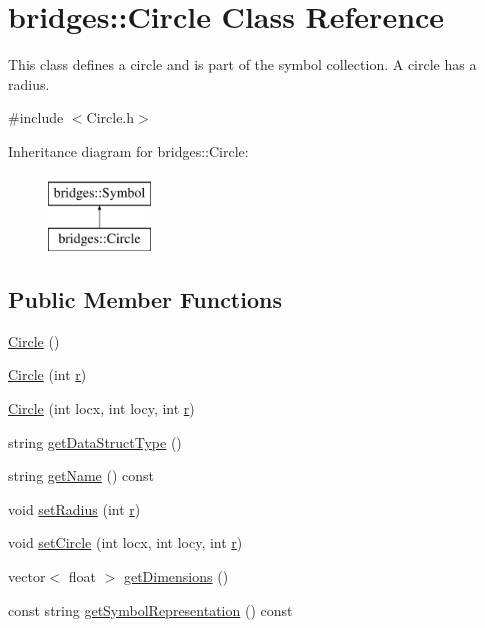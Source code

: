 \hypertarget{classbridges_1_1_circle}{}\section{bridges\+::Circle Class Reference}
\label{classbridges_1_1_circle}


This class defines a circle and is part of the symbol collection. A circle has a radius.  




{\ttfamily \#include $<$Circle.\+h$>$}

Inheritance diagram for bridges\+::Circle\+:\begin{figure}[H]
\begin{center}
\leavevmode
\includegraphics[height=2.000000cm]{classbridges_1_1_circle}
\end{center}
\end{figure}
\subsection*{Public Member Functions}
\begin{DoxyCompactItemize}
\item 
\mbox{\hyperlink{classbridges_1_1_circle_a97471b91ab283daf66e257ba982bf404}{Circle}} ()
\item 
\mbox{\hyperlink{classbridges_1_1_circle_a970e38244503f91ca4003acb183763fb}{Circle}} (int \mbox{\hyperlink{namespacebridges_acfb0a4f7877d8f63de3e6862004c50eda4b43b0aee35624cd95b910189b3dc231}{r}})
\item 
\mbox{\hyperlink{classbridges_1_1_circle_a09b339c2b9f3ee8dfa95d05cb695bb59}{Circle}} (int locx, int locy, int \mbox{\hyperlink{namespacebridges_acfb0a4f7877d8f63de3e6862004c50eda4b43b0aee35624cd95b910189b3dc231}{r}})
\item 
string \mbox{\hyperlink{classbridges_1_1_circle_a8a6bc6d07c9c49db3967c741b49be44c}{get\+Data\+Struct\+Type}} ()
\item 
string \mbox{\hyperlink{classbridges_1_1_circle_ae3aba409ad5868406efa736434ada2fa}{get\+Name}} () const
\item 
void \mbox{\hyperlink{classbridges_1_1_circle_a4ddbedd4590cd04692c0be3e760a680c}{set\+Radius}} (int \mbox{\hyperlink{namespacebridges_acfb0a4f7877d8f63de3e6862004c50eda4b43b0aee35624cd95b910189b3dc231}{r}})
\item 
void \mbox{\hyperlink{classbridges_1_1_circle_a5b3a64ec4e16eb53c7a9415ef435e7ae}{set\+Circle}} (int locx, int locy, int \mbox{\hyperlink{namespacebridges_acfb0a4f7877d8f63de3e6862004c50eda4b43b0aee35624cd95b910189b3dc231}{r}})
\item 
vector$<$ float $>$ \mbox{\hyperlink{classbridges_1_1_circle_a06e97818128abf9b9caa72aa4d05a704}{get\+Dimensions}} ()
\item 
const string \mbox{\hyperlink{classbridges_1_1_circle_aaee59a0d8ad00c75f7547bac2cfabd38}{get\+Symbol\+Representation}} () const
\end{DoxyCompactItemize}
